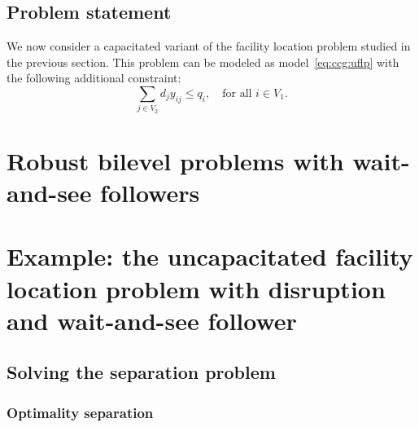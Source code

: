 \subsection{Problem statement}

We now consider a capacitated variant of the facility location problem studied
in the previous section. This problem can be modeled as
model~\eqref{eq:ccg:uflp} with the following additional constraint:
\begin{equation*}
    \sum_{j\in V_2} d_jy_{ij} \le q_i, \quad \text{for all } i\in V_1.
\end{equation*}

\section{Robust bilevel problems with wait-and-see followers}

\section[Example: the bilevel UFLP with disruption]{Example: the uncapacitated facility location problem with disruption and wait-and-see follower}

\subsection{Solving the separation problem}

\subsubsection{Optimality separation}
